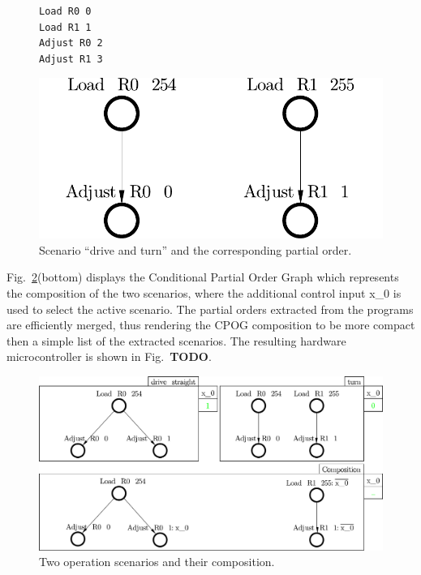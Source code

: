 \begin{figure}
\centering
  \begin{minipage}[b]{0.5\textwidth}
\begin{verbatim}
Load R0 0
Load R1 1
Adjust R0 2
Adjust R1 3
\end{verbatim}
\vspace{5mm}
\end{minipage}
\begin{minipage}[b]{0.4\textwidth}
\includegraphics[scale=0.35]{img/ataed-scenario-turn.pdf}
\end{minipage}
\caption{Scenario ``drive and turn'' and the corresponding
partial order.\label{fig-scenarios-turn}}
\end{figure}

Fig.~\ref{fig-scenarios-composition}(bottom) displays the Conditional Partial
Order Graph which represents the composition of the two scenarios, where the
additional control input \textsf{x\_0} is used to select the active scenario.
The partial orders extracted from the programs are efficiently merged, thus
rendering the CPOG composition to be more compact then a simple list of the
extracted scenarios. The resulting hardware microcontroller is shown in
Fig.~\textbf{TODO}.

\begin{figure}
\centerline{\includegraphics[scale=0.35]{img/ataed-composition.pdf}}
\caption{Two operation scenarios and their composition.\label{fig-scenarios-composition}}
\end{figure}

